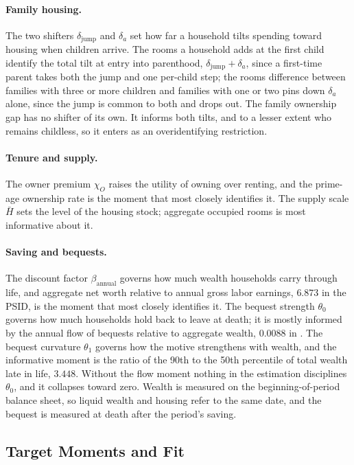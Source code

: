 \documentclass[11pt]{article}
\begin{document}
\paragraph{Family housing.}
The two shifters $\delta_{\mathrm{jump}}$ and $\delta_a$ set how far a
household tilts spending toward housing when children arrive. The rooms a
household adds at the first child identify the total tilt at entry into
parenthood, $\delta_{\mathrm{jump}}+\delta_a$, since a first-time parent
takes both the jump and one per-child step; the rooms difference between
families with three or more children and families with one or two pins down
$\delta_a$ alone, since the jump is common to both and drops out. The family
ownership gap has no shifter of its own. It informs both tilts, and to a
lesser extent who remains childless, so it enters as an overidentifying
restriction.

\paragraph{Tenure and supply.}
The owner premium $\chi_O$ raises the utility of owning over renting, and the
prime-age ownership rate is the moment that most closely identifies it. The
supply scale $\bar H$ sets the level of the housing stock; aggregate occupied
rooms is most informative about it.

\paragraph{Saving and bequests.}
The discount factor $\beta_{\mathrm{annual}}$ governs how much wealth
households carry through life, and aggregate net worth relative to annual
gross labor earnings, $6.873$ in the PSID, is the moment that most closely
identifies it. The bequest strength $\theta_0$ governs how much households
hold back to leave at death; it is mostly informed by the annual flow of
bequests relative to aggregate wealth, $0.0088$ in \citet{denardiYang2014}.
The bequest curvature $\theta_1$ governs how the motive strengthens with
wealth, and the informative moment is the ratio of the 90th to the 50th
percentile of total wealth late in life, $3.448$. Without the flow moment
nothing in the estimation disciplines $\theta_0$, and it collapses toward
zero. Wealth is measured on the beginning-of-period balance sheet, so liquid
wealth and housing refer to the same date, and the bequest is measured at
death after the period's saving.

\subsection{Target Moments and Fit}
\end{document}
